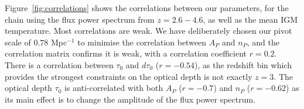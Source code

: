 % 

Figure~\ref{fig:correlations} shows the correlations between our parameters, for the chain using the flux power spectrum from $z=2.6 - 4.6$, as well as the mean IGM temperature.
Most correlations are weak.
We have deliberately chosen our pivot scale of $0.78$ Mpc$^{-1}$ to minimise the correlation between $A_P$ and $n_P$, and the correlation matrix confirms it is weak, with a correlation coefficient $r=0.2$. 
There is a correlation between $\tau_0$ and $d\tau_0$ ($r=-0.54$), as the redshift bin which provides the strongest constraints on the optical depth is not exactly $z=3$.
The optical depth $\tau_0$ is anti-correlated with both $A_P$ ($r=-0.7$) and $n_P$ ($r=-0.62$) as its main effect is to change the amplitude of the flux power spectrum. 

